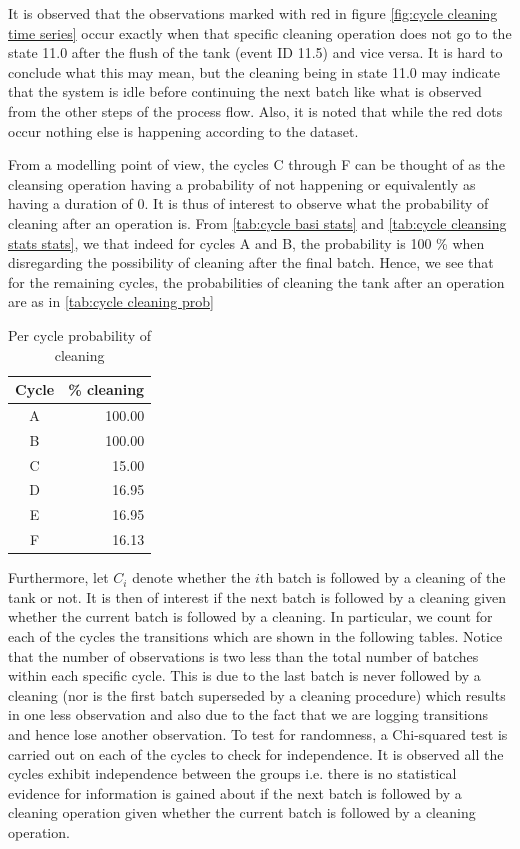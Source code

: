 \documentclass[../Thesis.tex]{subfiles}
\begin{document}
It is observed that the observations marked with red in figure \ref{fig:cycle cleaning time series} occur exactly when that specific cleaning operation does not go to the state 11.0 after the flush of the tank (event ID 11.5) and vice versa. It is hard to conclude what this may mean, but the cleaning being in state 11.0 may indicate that the system is idle before continuing the next batch like what is observed from the other steps of the process flow. Also, it is noted that while the red dots occur nothing else is happening according to the dataset.


From a modelling point of view, the cycles C through F can be thought of as the cleansing operation having a probability of not happening or equivalently as having a duration of 0. It is thus of interest to observe what the probability of cleaning after an operation is. From \autoref{tab:cycle basi stats} and \autoref{tab:cycle cleansing stats stats}, we that indeed for cycles A and B, the probability is 100 \% when disregarding the possibility of cleaning after the final batch. Hence, we see that for the remaining cycles, the probabilities of cleaning the tank after an operation are as in \autoref {tab:cycle cleaning prob}

\begin{table}[h]
    \centering
    \begin{tabular}{c|r}
        Cycle & \% cleaning \\ \hline
        A & 100.00 \\
        B & 100.00 \\
        C & 15.00 \\
        D & 16.95\\
        E & 16.95\\
        F & 16.13
    \end{tabular}
    \caption{Per cycle probability of cleaning}
    \label{tab:cycle cleaning prob}
\end{table}


Furthermore, let $C_i$ denote whether the $i$th batch is followed by a cleaning of the tank or not. It is then of interest if the next batch is followed by a cleaning given whether the current batch is followed by a cleaning. In particular, we count for each of the cycles the transitions which are shown in the following tables. Notice that the number of observations is two less than the total number of batches within each specific cycle. This is due to the last batch is never followed by a cleaning (nor is the first batch superseded by a cleaning procedure) which results in one less observation and also due to the fact that we are logging transitions and hence lose another observation. To test for randomness, a Chi-squared test is carried out on each of the cycles to check for independence. It is observed all the cycles exhibit independence between the groups i.e. there is no statistical evidence for information is gained about if the next batch is followed by a cleaning operation given whether the current batch is followed by a cleaning operation.
\end{document}
